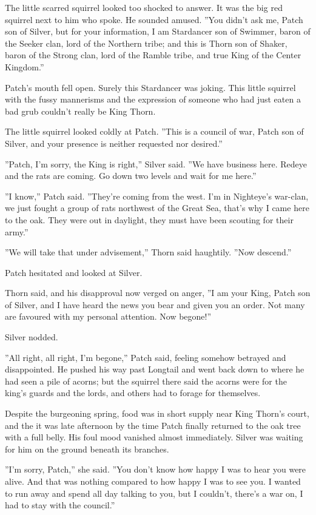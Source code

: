 \documentclass[12pt]{book}
\begin{document}
The little scarred squirrel looked too shocked to answer. It was the big red squirrel next to him who spoke. He sounded amused. ''You didn't ask me, Patch son of Silver, but for your information, I am Stardancer son of Swimmer, baron of the Seeker clan, lord of the Northern tribe; and this is Thorn son of Shaker, baron of the Strong clan, lord of the Ramble tribe, and true King of the Center Kingdom.''

Patch's mouth fell open. Surely this Stardancer was joking. This little squirrel with the fussy mannerisms and the expression of someone who had just eaten a bad grub couldn't really be King Thorn.

The little squirrel looked coldly at Patch. ''This is a council of war, Patch son of Silver, and your presence is neither requested nor desired.''

''Patch, I'm sorry, the King is right,'' Silver said. ''We have business here. Redeye and the rats are coming. Go down two levels and wait for me here.''

''I know,'' Patch said. ''They're coming from the west. I'm in Nighteye's war-clan, we just fought a group of rats northwest of the Great Sea, that's why I came here to the oak. They were out in daylight, they must have been scouting for their army.''

''We will take that under advisement,'' Thorn said haughtily. ''Now descend.''

Patch hesitated and looked at Silver.

Thorn said, and his disapproval now verged on anger, ''I am your King, Patch son of Silver, and I have heard the news you bear and given you an order. Not many are favoured with my personal attention. Now begone!''

Silver nodded.

''All right, all right, I'm begone,'' Patch said, feeling somehow betrayed and disappointed. He pushed his way past Longtail and went back down to where he had seen a pile of acorns; but the squirrel there said the acorns were for the king's guards and the lords, and others had to forage for themselves.

Despite the burgeoning spring, food was in short supply near King Thorn's court, and the it was late afternoon by the time Patch finally returned to the oak tree with a full belly. His foul mood vanished almost immediately. Silver was waiting for him on the ground beneath its branches.

''I'm sorry, Patch,'' she said. ''You don't know how happy I was to hear you were alive. And that was nothing compared to how happy I was to see you. I wanted to run away and spend all day talking to you, but I couldn't, there's a war on, I had to stay with the council.''
\end{document}
